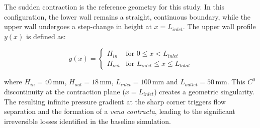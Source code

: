 \documentclass[12pt, a4paper]{article}
\begin{document}
\noindent
\begin{minipage}{0.48\textwidth}
	The sudden contraction is the reference geometry for this study. In this configuration, the lower wall remains a straight, continuous boundary, while the upper wall undergoes a step-change in height at $x = L_{inlet}$. The upper wall profile $y(x)$ is defined as:
	
	\begin{equation}
		y(x) = 
		\begin{cases} 
			H_{in} & \text{for } 0 \leq x < L_{inlet} \\
			H_{out} & \text{for } L_{inlet} \leq x \leq L_{total}
		\end{cases}
	\end{equation}
	
	where $H_{in} = 40\,\text{mm}$, $H_{out} = 18\,\text{mm}$, $L_{inlet} = 100\,\text{mm}$ and $L_{outlet} = 50\,\text{mm}$. This $C^0$ discontinuity at the contraction plane ($x = L_{inlet}$) creates a geometric singularity. The resulting infinite pressure gradient at the sharp corner triggers flow separation and the formation of a \textit{vena contracta}, leading to the significant irreversible losses identified in the baseline simulation.
\end{minipage}
\hfill
\end{document}
